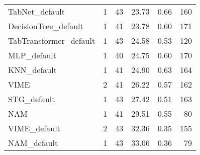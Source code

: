 \begin{tabular}{lrrrrr}
TabNet_default             &                  1 &  43 &  23.73 &                           0.66 &   160 \\
DecisionTree_default       &                  1 &  41 &  23.78 &                           0.60 &   171 \\
TabTransformer_default     &                  1 &  43 &  24.58 &                           0.53 &   120 \\
MLP_default                &                  1 &  40 &  24.75 &                           0.60 &   170 \\
KNN_default                &                  1 &  41 &  24.90 &                           0.63 &   164 \\
VIME                       &                  2 &  41 &  26.22 &                           0.57 &   162 \\
STG_default                &                  1 &  43 &  27.42 &                           0.51 &   163 \\
NAM                        &                  1 &  41 &  29.51 &                           0.55 &    80 \\
VIME_default               &                  2 &  43 &  32.36 &                           0.35 &   155 \\
NAM_default                &                  1 &  43 &  33.06 &                           0.36 &    79 \\
\bottomrule
\end{tabular}
